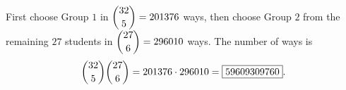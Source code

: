 First choose Group $1$ in $\dbinom{32}{5}=201376$ ways, then choose Group $2$ from the remaining $27$ students in $\dbinom{27}{6}=296010$ ways. The number of ways is
\[\dbinom{32}{5}\dbinom{27}{6}=201376\cdot296010=\boxed{59609309760}.\]
